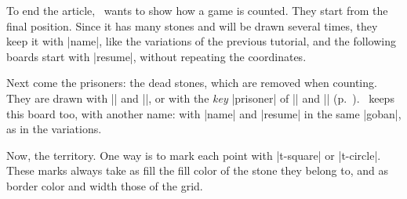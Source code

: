 \begin{goban}
\begin{figure}[H]
\begin{goban}[label = {at = {above, left}}]
	\end{goban}
\end{figure}

To end the article, \karu\ wants to show how a game is counted. They start from the final position. Since it has many stones and will be drawn several times, they keep it with |name|, like the variations of the previous tutorial, and the following boards start with |resume|, without repeating the coordinates.

\begin{codeexample}[]

	\begin{goban}[label = {at = {above, left}}, name = final]
	\end{goban}
\end{codeexample}

Next come the prisoners: the dead stones, which are removed when counting. They are drawn with |\prisoner| and |\prisoners|, or with the \emph{key} |prisoner| of |\stone| and |\stones| (p.~\pageref{sec:piedras}). \karu\ keeps this board too, with another name: with |name| and |resume| in the same |goban|, as in the variations.

\begin{codeexample}[width=4.75cm]

	\begin{goban}[label = {at = {above, left}},
		resume = final, name = final2]
	\end{goban}
\end{codeexample}

Now, the territory. One way is to mark each point with |t-square| or |t-circle|. These marks always take as fill the fill color of the stone they belong to, and as border color and width those of the grid.

\begin{codeexample}[width=4.75cm]

	\begin{goban}[label = {at = {above, left}}, resume = final2]
	\end{goban}
\end{codeexample}


\end{goban}
